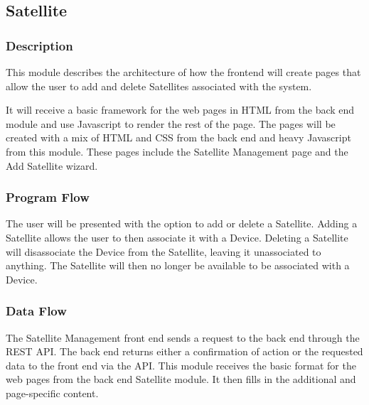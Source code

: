 
\subsection{Satellite}

\subsubsection{Description}

This module describes the architecture of how the frontend will create pages that allow the user to add and delete Satellites associated with the system. 

It will receive a basic framework for the web pages in HTML from the back end module and use Javascript to render the rest of the page. 
The pages will be created with a mix of HTML and CSS from the back end and heavy Javascript from this module. 
These pages include the Satellite Management page and the Add Satellite wizard. 

\subsubsection{Program Flow}

The user will be presented with the option to add or delete a Satellite. 
Adding a Satellite allows the user to then associate it with a Device. 
Deleting a Satellite will disassociate the Device from the Satellite, leaving it unassociated to anything. 
The Satellite will then no longer be available to be associated with a Device. 

\subsubsection{Data Flow}

The Satellite Management front end sends a request to the back end through the REST API. 
The back end returns either a confirmation of action or the requested data to the front end via the API. 
This module receives the basic format for the web pages from the back end Satellite module. 
It then fills in the additional and page-specific content. 


